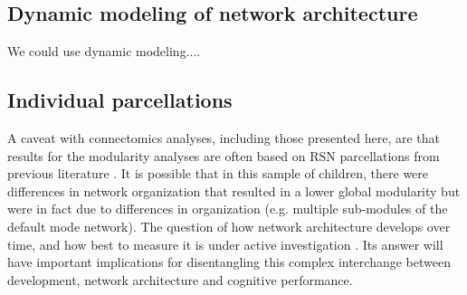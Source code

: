 \subsection{Dynamic modeling of network architecture}

We could use dynamic modeling....

\subsection{Individual parcellations}

A caveat with connectomics analyses, including those presented here, are that results for the modularity analyses are often based on RSN parcellations from previous literature \cite{Power2011}. It is possible that in this sample of children, there were differences in network organization that resulted in a lower global modularity but were in fact due to differences in organization (e.g. multiple sub-modules of the default mode network). The question of how network architecture develops over time, and how best to measure it is under active investigation \cite{Cao2016}. Its answer will have important implications for disentangling this complex interchange between development, network architecture and cognitive performance.

